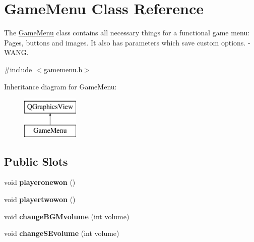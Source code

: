 \hypertarget{class_game_menu}{}\section{Game\+Menu Class Reference}
\label{class_game_menu}


The \hyperlink{class_game_menu}{Game\+Menu} class contains all necessary things for a functional game menu\+: Pages, buttons and images. It also has parameters which save custom options. -\/ W\+A\+NG.  




{\ttfamily \#include $<$gamemenu.\+h$>$}

Inheritance diagram for Game\+Menu\+:\begin{figure}[H]
\begin{center}
\leavevmode
\includegraphics[height=2.000000cm]{class_game_menu}
\end{center}
\end{figure}
\subsection*{Public Slots}
\begin{DoxyCompactItemize}
\item 
void {\bfseries playeronewon} ()\hypertarget{class_game_menu_a3e3677db66b2c65a9f0de92f41fe3698}{}\label{class_game_menu_a3e3677db66b2c65a9f0de92f41fe3698}

\item 
void {\bfseries playertwowon} ()\hypertarget{class_game_menu_a7cf2904dfdb06e5bd6423d80fda61739}{}\label{class_game_menu_a7cf2904dfdb06e5bd6423d80fda61739}

\item 
void {\bfseries change\+B\+G\+Mvolume} (int volume)\hypertarget{class_game_menu_a41521364226c92bfdedc97b4445c8763}{}\label{class_game_menu_a41521364226c92bfdedc97b4445c8763}

\item 
void {\bfseries change\+S\+Evolume} (int volume)\hypertarget{class_game_menu_abb166085ca8e741d1901cdedda86f0d3}{}\label{class_game_menu_abb166085ca8e741d1901cdedda86f0d3}

\end{DoxyCompactItemize}
